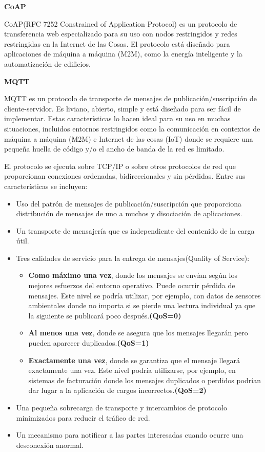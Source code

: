 \textbf{CoAP} 

CoAP(RFC 7252 Constrained of Application Protocol) es un protocolo de transferencia web especializado para su uso con nodos restringidos y redes restringidas en la Internet de las Cosas. El protocolo está diseñado para aplicaciones de máquina a máquina (M2M), como la energía inteligente y la automatización de edificios.\cite{coap_space}

\textbf{MQTT} 

MQTT es un protocolo de transporte de mensajes de publicación/suscripción de cliente-servidor. Es liviano, abierto, simple y está diseñado para ser fácil de implementar. Estas características lo hacen ideal para su uso en muchas situaciones, incluidos entornos restringidos como la comunicación en contextos de máquina a máquina (M2M) e Internet de las cosas (IoT) donde se requiere una pequeña huella de código y/o el ancho de banda de la red es limitado.

El protocolo se ejecuta sobre TCP/IP o sobre otros protocolos de red que proporcionan conexiones ordenadas, bidireccionales y sin pérdidas. Entre sus características se incluyen:

\begin{itemize}
    \item Uso del patrón de mensajes de publicación/suscripción que proporciona distribución de mensajes de uno a muchos y disociación de aplicaciones.
    \item Un transporte de mensajería que es independiente del contenido de la carga útil.
    \item Tres calidades de servicio para la entrega de mensajes(Quality of Service):
    \begin{itemize}
        \item \textbf{Como máximo una vez}, donde los mensajes se envían según los mejores esfuerzos del entorno operativo. Puede ocurrir pérdida de mensajes. Este nivel se podría utilizar, por ejemplo, con datos de sensores ambientales donde no importa si se pierde una lectura individual ya que la siguiente se publicará poco después.\textbf{(QoS=0)}
        \item \textbf{Al menos una vez}, donde se asegura que los mensajes llegarán pero pueden aparecer duplicados.\textbf{(QoS=1)}
        \item \textbf{Exactamente una vez}, donde se garantiza que el mensaje llegará exactamente una vez. Este nivel podría utilizarse, por ejemplo, en sistemas de facturación donde los mensajes duplicados o perdidos podrían dar lugar a la aplicación de cargos incorrectos.\textbf{(QoS=2)}
    \end{itemize}
    \item Una pequeña sobrecarga de transporte y intercambios de protocolo minimizados para reducir el tráfico de red.
    \item Un mecanismo para notificar a las partes interesadas cuando ocurre una desconexión anormal.\cite{mqtt-v5.0}
\end{itemize}

